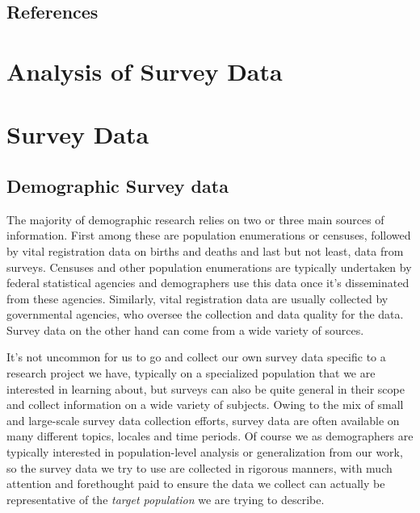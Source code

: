 \documentclass[
  letterpaper,
  DIV=11,
  numbers=noendperiod]{scrreprt}
\begin{document}
\hypertarget{references}{%
\section{References}\label{references}}


\hypertarget{analysis-of-survey-data}{%
\chapter{Analysis of Survey Data}\label{analysis-of-survey-data}}

\newpage


\hypertarget{survey-data}{%
\chapter{Survey Data}\label{survey-data}}

\hypertarget{demographic-survey-data}{%
\section{Demographic Survey data}\label{demographic-survey-data}}

The majority of demographic research relies on two or three main sources
of information. First among these are population enumerations or
censuses, followed by vital registration data on births and deaths and
last but not least, data from surveys. Censuses and other population
enumerations are typically undertaken by federal statistical agencies
and demographers use this data once it's disseminated from these
agencies. Similarly, vital registration data are usually collected by
governmental agencies, who oversee the collection and data quality for
the data. Survey data on the other hand can come from a wide variety of
sources.

It's not uncommon for us to go and collect our own survey data specific
to a research project we have, typically on a specialized population
that we are interested in learning about, but surveys can also be quite
general in their scope and collect information on a wide variety of
subjects. Owing to the mix of small and large-scale survey data
collection efforts, survey data are often available on many different
topics, locales and time periods. Of course we as demographers are
typically interested in population-level analysis or generalization from
our work, so the survey data we try to use are collected in rigorous
manners, with much attention and forethought paid to ensure the data we
collect can actually be representative of the \emph{target population}
we are trying to describe.
\end{document}
